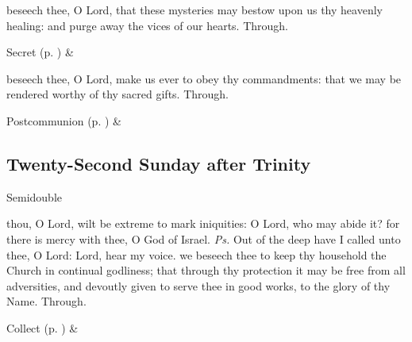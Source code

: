 
\secret
{} beseech thee, O Lord, that these mysteries may bestow upon us thy heavenly healing: and purge away the vices of our hearts. Through.


\begin{rubric}
     Secret  (p. \pageref{SPSaints}) \&  
\end{rubric}


\postcommunion
{} beseech thee, O Lord, make us ever to obey thy commandments: that we may be rendered worthy of thy sacred gifts. Through.


\begin{rubric}
     Postcommunion  (p. \pageref{SPSaints}) \&  
\end{rubric}


\clearpage
\subsection{Twenty-Second Sunday after Trinity}
\begin{inhead}
{Semidouble}
\end{inhead}


\introit
{} thou, O Lord, wilt be extreme to mark iniquities: O Lord, who may abide it? for there is mercy with thee, O God of Israel. \textit{Ps.} Out of the deep have I called unto thee, O Lord: Lord, hear my voice.
\collect
{} we beseech thee to keep thy household the Church in continual godliness; that through thy protection it may be free from all adversities, and devoutly given to serve thee in good works, to the glory of thy Name. Through.
\begin{rubric}
     Collect  (p. \pageref{SPSaints}) \&  
\end{rubric}

